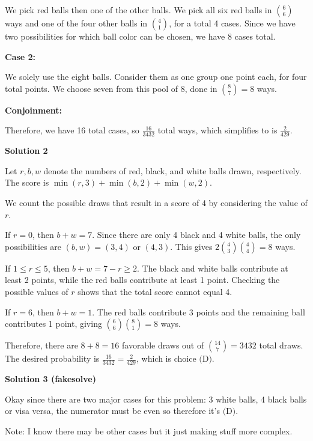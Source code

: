 \begin{enumerate}
 We pick red balls then one of the other balls. We pick all six red balls in $\binom{6}{6}$ ways and one of the four other balls in $\binom{4}{1}$, for a total 4 cases. Since we have two possibilities for which ball color can be chosen, we have 8 cases total.

 \textbf{Case 2:}

 We solely use the eight balls. Consider them as one group one point each, for four total points. We choose seven from this pool of 8, done in $\binom{8}{7} = 8$ ways.

 \textbf{Conjoinment:}

 Therefore, we have 16 total cases, so $\frac{16}{3432}$ total ways, which simplifies to is $\boxed{\frac{2}{429}}$.

 



\textbf{Solution 2}

Let $r,b,w$ denote the numbers of red, black, and white balls drawn, respectively. The score is $\min(r,3)+\min(b,2)+\min(w,2)$.

 
We count the possible draws that result in a score of 4 by considering the value of $r$.

 
If $r=0$, then $b+w=7$. Since there are only 4 black and 4 white balls, the only possibilities are $(b,w)=(3,4)$ or $(4,3)$. This gives $2\binom{4}{3}\binom{4}{4}=8$ ways.

 
If $1\leq r\leq5$, then $b+w=7-r\geq2$. The black and white balls contribute at least 2 points, while the red balls contribute at least 1 point. Checking the possible values of $r$ shows that the total score cannot equal 4.

 
If $r=6$, then $b+w=1$. The red balls contribute 3 points and the remaining ball contributes 1 point, giving $\binom{6}{6}\binom{8}{1}=8$ ways.

 
Therefore, there are $8+8=16$ favorable draws out of $\binom{14}{7}=3432$ total draws. The desired probability is $\boxed{\frac{16}{3432}=\frac{2}{429}}$, which is choice $\boxed{\text{(D)}}$.

 



\textbf{Solution 3 (fakesolve)}

Okay since there are two major cases for this problem: 3 white balls, 4 black balls or visa versa, the numerator must be even so therefore it's $\boxed{\text{(D)}}$.

 Note: I know there may be other cases but it just making stuff more complex.


\end{enumerate}
